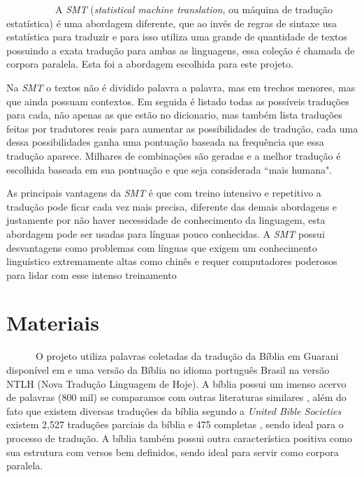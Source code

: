 \documentclass[12pt]{article}
\begin{document}
~~~~~~~~~~A \textit{SMT} (\textit{statistical machine translation}, ou máquina de tradução estatística) é uma abordagem diferente, que ao invés de regras de sintaxe usa estatística para traduzir e para isso utiliza uma grande de quantidade de textos possuindo a exata tradução para ambas as linguagens, essa coleção é chamada de corpora paralela. Esta foi a abordagem escolhida para este projeto\cite{Geitgey:16}.

Na \textit{SMT} o textos não é dividido palavra a palavra, mas em trechos menores, mas que ainda possuam contextos. Em seguida é listado todas as possíveis traduções para cada, não apenas as que estão no dicionario, mas também lista traduções feitas por tradutores reais para aumentar as possibilidades de tradução, cada uma dessa possibilidades ganha uma pontuação baseada na frequência que essa tradução aparece. Milhares de combinações são geradas e a melhor tradução é escolhida baseada em sua pontuação e que seja considerada ``mais humana"\cite{Geitgey:16}.

As principais vantagens da \textit{SMT} é que com treino intensivo e repetitivo a tradução pode ficar cada vez mais precisa, diferente das demais abordagens e justamente por não haver necessidade de conhecimento da linguagem, esta abordagem pode ser usadas para línguas pouco conhecidas. A \textit{SMT} possui desvantagens como problemas com línguas que exigem um conhecimento linguístico extremamente altas como chinês e requer computadores poderosos para lidar com esse intenso treinamento \cite{SMT}

\section{Materiais}

~~~~~~O projeto utiliza palavras coletadas da tradução da Bíblia em Guarani disponível em \cite{angelo} e uma versão da Bíblia no idioma português Brasil na versão NTLH (Nova Tradução Linguagem de Hoje). A bíblia possui um imenso acervo de palavras (800 mil) se comparamos com outras literaturas similares \cite{Christodouloupoulos:2015:MPC:2767936.2767953}, além do fato que existem diversas traduções da bíblia segundo a \textit{United Bible Societies} existem 2,527 traduções parciais da bíblia e 475 completas \cite{Christodouloupoulos:2015:MPC:2767936.2767953}, sendo ideal para o processo de tradução. A bíblia também possui outra característica positiva como sua estrutura com versos bem definidos, sendo ideal para servir como corpora paralela.
\end{document}
